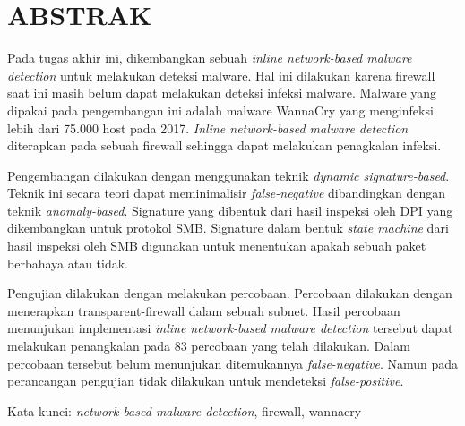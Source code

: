 \clearpage
\chapter*{ABSTRAK}

Pada tugas akhir ini, dikembangkan sebuah \textit{inline network-based malware detection} untuk melakukan deteksi malware. Hal ini dilakukan karena firewall saat ini masih belum dapat melakukan deteksi infeksi malware. Malware yang dipakai pada pengembangan ini adalah malware WannaCry yang menginfeksi lebih dari 75.000 host pada 2017. \textit{Inline network-based malware detection} diterapkan pada sebuah firewall sehingga dapat melakukan penagkalan infeksi.

Pengembangan dilakukan dengan menggunakan teknik \textit{dynamic signature-based}. Teknik ini secara teori dapat meminimalisir \textit{false-negative} dibandingkan dengan teknik \textit{anomaly-based}. Signature yang dibentuk dari hasil inspeksi oleh DPI yang dikembangkan untuk protokol SMB. Signature dalam bentuk \textit{state machine} dari hasil inspeksi oleh SMB digunakan untuk menentukan apakah sebuah paket berbahaya atau tidak.

Pengujian dilakukan dengan melakukan percobaan. Percobaan dilakukan dengan menerapkan transparent-firewall dalam sebuah subnet. Hasil percobaan menunjukan implementasi \textit{inline network-based malware detection} tersebut dapat melakukan penangkalan pada 83 percobaan yang telah dilakukan. Dalam percobaan tersebut belum menunjukan ditemukannya \textit{false-negative}. Namun pada perancangan pengujian tidak dilakukan untuk mendeteksi \textit{false-positive}.

\vspace{17px} \noindent Kata kunci: \textit{network-based malware detection}, firewall, wannacry

\clearpage
